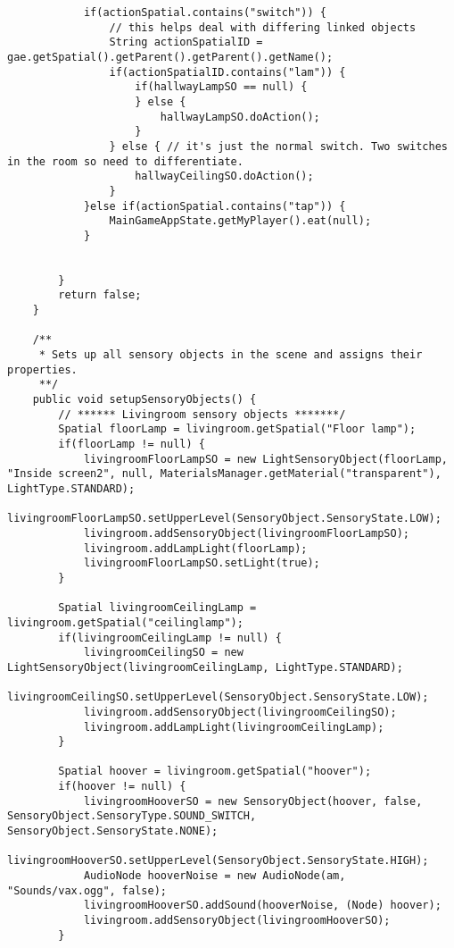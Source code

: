 \begin{lstlisting}
            if(actionSpatial.contains("switch")) {
                // this helps deal with differing linked objects
                String actionSpatialID = gae.getSpatial().getParent().getParent().getName(); 
                if(actionSpatialID.contains("lam")) {
                    if(hallwayLampSO == null) {
                    } else {
                        hallwayLampSO.doAction();
                    }
                } else { // it's just the normal switch. Two switches in the room so need to differentiate. 
                    hallwayCeilingSO.doAction();
                }
            }else if(actionSpatial.contains("tap")) {
                MainGameAppState.getMyPlayer().eat(null);
            }
            
            
        } 
        return false;
    }
    
    /**
     * Sets up all sensory objects in the scene and assigns their properties.
     **/
    public void setupSensoryObjects() {
        // ****** Livingroom sensory objects *******/
        Spatial floorLamp = livingroom.getSpatial("Floor lamp");
        if(floorLamp != null) {
            livingroomFloorLampSO = new LightSensoryObject(floorLamp, "Inside screen2", null, MaterialsManager.getMaterial("transparent"), LightType.STANDARD);
            livingroomFloorLampSO.setUpperLevel(SensoryObject.SensoryState.LOW);
            livingroom.addSensoryObject(livingroomFloorLampSO);
            livingroom.addLampLight(floorLamp);
            livingroomFloorLampSO.setLight(true);
        }
        
        Spatial livingroomCeilingLamp = livingroom.getSpatial("ceilinglamp");
        if(livingroomCeilingLamp != null) {
            livingroomCeilingSO = new LightSensoryObject(livingroomCeilingLamp, LightType.STANDARD);
            livingroomCeilingSO.setUpperLevel(SensoryObject.SensoryState.LOW);
            livingroom.addSensoryObject(livingroomCeilingSO);
            livingroom.addLampLight(livingroomCeilingLamp);
        }
        
        Spatial hoover = livingroom.getSpatial("hoover");
        if(hoover != null) {
            livingroomHooverSO = new SensoryObject(hoover, false, SensoryObject.SensoryType.SOUND_SWITCH, SensoryObject.SensoryState.NONE);
            livingroomHooverSO.setUpperLevel(SensoryObject.SensoryState.HIGH);
            AudioNode hooverNoise = new AudioNode(am, "Sounds/vax.ogg", false); 
            livingroomHooverSO.addSound(hooverNoise, (Node) hoover);
            livingroom.addSensoryObject(livingroomHooverSO);
        }
        

\end{lstlisting}
